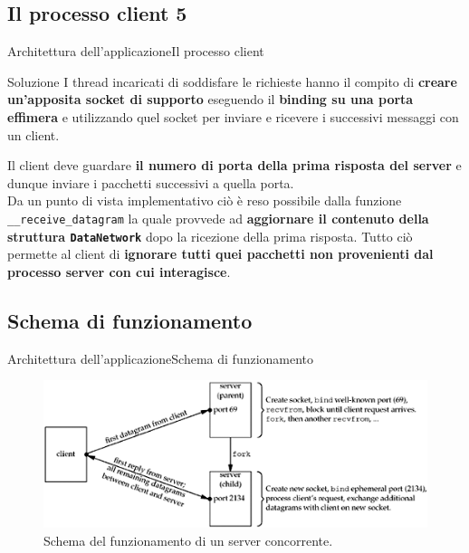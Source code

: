\documentclass[10pt]{beamer}
\begin{document}
\subsection{Il processo client 5}
\begin{frame}[fragile]{Architettura dell'applicazione}{Il processo client}

\begin{block}{Soluzione}
I thread incaricati di soddisfare le richieste hanno il compito di \textbf{creare un'apposita socket di supporto} eseguendo il \textbf{binding su una porta effimera} e utilizzando quel socket per inviare e ricevere i successivi messaggi con un client.
\end{block}

\vspace*{10px}
Il client deve guardare \textbf{il numero di porta della prima risposta del server} e dunque inviare i pacchetti successivi a quella porta. \\

\vspace*{10px}
Da un punto di vista implementativo ciò è reso possibile dalla funzione \texttt{\_\_receive\_datagram} la quale provvede ad \textbf{aggiornare il contenuto della struttura \texttt{DataNetwork}} dopo la ricezione della prima risposta. Tutto ciò permette al client di \textbf{ignorare tutti quei pacchetti non provenienti dal processo server con cui interagisce}.
\end{frame}



\subsection{Schema di funzionamento}
\begin{frame}{Architettura dell'applicazione}{Schema di funzionamento}

\begin{figure}
\centering
\includegraphics[width=\textwidth]{Concorrente}
\caption{Schema del funzionamento di un server concorrente.}
\label{fig:Concorrente}
\end{figure}

\end{frame}
\end{document}
